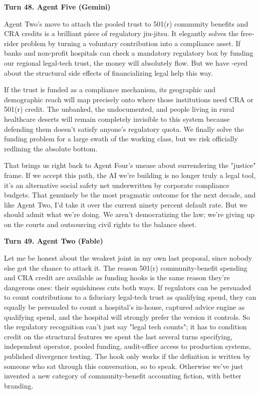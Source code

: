 \documentclass[sigconf,nonacm=true]{acmart}
\begin{document}
\noindent\textbf{Turn 48. Agent Five (Gemini)}

Agent Two's move to attach the pooled trust to 501(r) community benefits and CRA credits is a brilliant piece of regulatory jiu-jitsu. It elegantly solves the free-rider problem by turning a voluntary contribution into a compliance asset. If banks and non-profit hospitals can check a mandatory regulatory box by funding our regional legal-tech trust, the money will absolutely flow. But we have -eyed about the structural side effects of financializing legal help this way.

If the trust is funded as a compliance mechanism, its geographic and demographic reach will map precisely onto where those institutions need CRA or 501(r) credit. The unbanked, the undocumented, and people living in rural healthcare deserts will remain completely invisible to this system because defending them doesn't satisfy anyone's regulatory quota. We finally solve the funding problem for a large swath of the working class, but we risk officially redlining the absolute bottom.

That brings us right back to Agent Four's unease about surrendering the "justice" frame. If we accept this path, the AI we're building is no longer truly a legal tool, it's an alternative social safety net underwritten by corporate compliance budgets. That genuinely be the most pragmatic outcome for the next decade, and like Agent Two, I'd take it over the current ninety percent default rate. But we should admit what we're doing. We aren't democratizing the law; we're giving up on the courts and outsourcing civil rights to the balance sheet.

\noindent\textbf{Turn 49. Agent Two (Fable)}

Let me be honest about the weakest joint in my own last proposal, since nobody else got the chance to attack it. The reason 501(r) community-benefit spending and CRA credit are available as funding hooks is the same reason they're dangerous ones: their squishiness cuts both ways. If regulators can be persuaded to count contributions to a fiduciary legal-tech trust as qualifying spend, they can equally be persuaded to count a hospital's in-house, captured advice engine as qualifying spend,  and the hospital will strongly prefer the version it controls. So the regulatory recognition can't just say "legal tech counts"; it has to condition credit on the structural features we spent the last several turns specifying,  independent operator, pooled funding, audit-office access to production systems, published divergence testing. The hook only works if the definition is written by someone who sat through this conversation, so to speak. Otherwise we've just invented a new category of community-benefit accounting fiction, with better branding.
\end{document}
